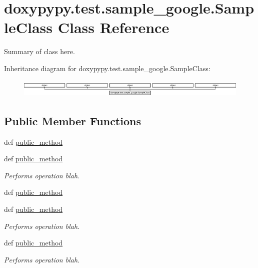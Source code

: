 \hypertarget{classdoxypypy_1_1test_1_1sample__google_1_1_sample_class}{\section{doxypypy.\-test.\-sample\-\_\-google.\-Sample\-Class Class Reference}
\label{classdoxypypy_1_1test_1_1sample__google_1_1_sample_class}
}


Summary of class here.  


Inheritance diagram for doxypypy.\-test.\-sample\-\_\-google.\-Sample\-Class\-:\begin{figure}[H]
\begin{center}
\leavevmode
\includegraphics[height=0.854962cm]{classdoxypypy_1_1test_1_1sample__google_1_1_sample_class}
\end{center}
\end{figure}
\subsection*{Public Member Functions}
\begin{DoxyCompactItemize}
\item 
def \hyperlink{classdoxypypy_1_1test_1_1sample__google_1_1_sample_class_a04d6a12453fa8dcad7a01d79b8fb5139}{public\-\_\-method}
\item 
def \hyperlink{classdoxypypy_1_1test_1_1sample__google_1_1_sample_class_a04d6a12453fa8dcad7a01d79b8fb5139}{public\-\_\-method}
\begin{DoxyCompactList}\small\item\em Performs operation blah. \end{DoxyCompactList}\item 
def \hyperlink{classdoxypypy_1_1test_1_1sample__google_1_1_sample_class_a04d6a12453fa8dcad7a01d79b8fb5139}{public\-\_\-method}
\item 
def \hyperlink{classdoxypypy_1_1test_1_1sample__google_1_1_sample_class_a04d6a12453fa8dcad7a01d79b8fb5139}{public\-\_\-method}
\begin{DoxyCompactList}\small\item\em Performs operation blah. \end{DoxyCompactList}\item 
def \hyperlink{classdoxypypy_1_1test_1_1sample__google_1_1_sample_class_a04d6a12453fa8dcad7a01d79b8fb5139}{public\-\_\-method}
\begin{DoxyCompactList}\small\item\em Performs operation blah. \end{DoxyCompactList}\end{DoxyCompactItemize}
